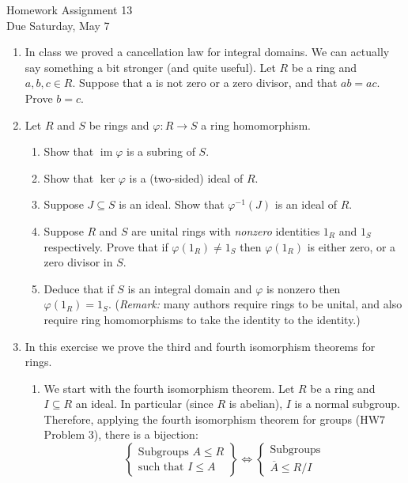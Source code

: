 \documentclass[11pt]{article}
\newcommand{\im}{\operatorname{im}}
\begin{document}
\begin{center}
\Large {Homework Assignment 13}\\
\small {Due Saturday, May 7}
\end{center}
\begin{enumerate}
  \item{In class we proved a cancellation law for integral domains.  We can actually say something a bit stronger (and quite useful).  Let $R$ be a ring and $a,b,c\in R$.  Suppose that a is not zero or a zero divisor, and that $ab = ac$.  Prove $b=c$.}
  \item{
  Let $R$ and $S$ be rings and $\varphi:R\to S$ a ring homomorphism.
  \begin{enumerate}
    \item{Show that $\im\varphi$ is a subring of $S$.}
    \item{Show that $\ker\varphi$ is a (two-sided) ideal of $R$.}
    \item{Suppose $J\subseteq S$ is an ideal.  Show that $\varphi^{-1}(J)$ is an ideal of $R$.}
    \item{Suppose $R$ and $S$ are unital rings with \textit{nonzero} identities $1_R$ and $1_S$ respectively.  Prove that if $\varphi(1_R)\not=1_S$ then $\varphi(1_R)$ is either zero, or a zero divisor in $S$.}
    \item{Deduce that if $S$ is an integral domain and $\varphi$ is nonzero then $\varphi(1_R)=1_S$.  (\textit{Remark:} many authors require rings to be unital, and also require ring homomorphisms to take the identity to the identity.)}
  \end{enumerate}
  }
  \item{
  In this exercise we prove the third and fourth isomorphism theorems for rings.
  \begin{enumerate}
    \item{We start with the fourth isomorphism theorem.  Let $R$ be a ring and $I\subseteq R$ an ideal.  In particular (since $R$ is abelian), $I$ is a normal subgroup.  Therefore, applying the fourth isomorphism theorem for groups (HW7 Problem 3), there is a bijection:
    \[\left\{
    \begin{array}{c}
      \text{Subgroups }A\le R\\
      \text{such that }I\le A
    \end{array}\right\}
    \Longleftrightarrow
    \left\{
    \begin{array}{c}
      \text{Subgroups}\\
      \overline{A}\le R/I
    \end{array}
\]}
\end{enumerate}}
\end{enumerate}
\end{document}
